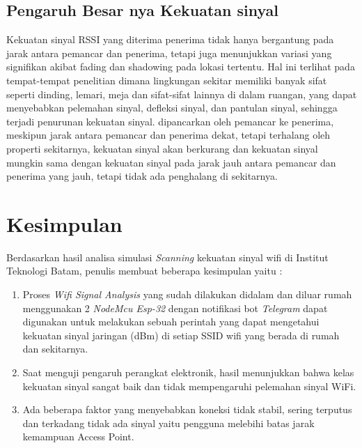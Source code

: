 \documentclass[conference]{IEEEtran}
\begin{document}
    

\subsection{Pengaruh Besar nya Kekuatan sinyal}



Kekuatan sinyal RSSI yang diterima penerima tidak hanya bergantung pada jarak antara pemancar dan penerima, tetapi juga menunjukkan variasi yang signifikan akibat fading dan shadowing pada lokasi tertentu. Hal ini terlihat pada tempat-tempat penelitian dimana lingkungan sekitar memiliki banyak sifat seperti dinding, lemari, meja dan sifat-sifat lainnya di dalam ruangan, yang dapat menyebabkan pelemahan sinyal, defleksi sinyal, dan pantulan sinyal, sehingga terjadi penurunan kekuatan sinyal. dipancarkan oleh pemancar ke penerima, meskipun jarak antara pemancar dan penerima dekat, tetapi terhalang oleh properti sekitarnya, kekuatan sinyal akan berkurang dan kekuatan sinyal mungkin sama dengan kekuatan sinyal pada jarak jauh antara pemancar dan penerima yang jauh, tetapi tidak ada penghalang di sekitarnya.

\section{Kesimpulan}

Berdasarkan hasil analisa simulasi \textit{Scanning} kekuatan sinyal wifi di Institut Teknologi Batam, penulis membuat beberapa kesimpulan yaitu :
\begin{enumerate}
    \item Proses \textit{Wifi Signal Analysis} yang sudah dilakukan didalam dan diluar rumah  menggunakan 2 \textit{NodeMcu Esp-32} dengan notifikasi bot \textit{Telegram} dapat digunakan untuk melakukan sebuah perintah yang dapat mengetahui kekuatan sinyal jaringan (dBm)
    di setiap SSID wifi yang berada di rumah dan sekitarnya.
    \item Saat menguji pengaruh perangkat elektronik, hasil menunjukkan bahwa kelas kekuatan sinyal sangat baik dan tidak mempengaruhi pelemahan sinyal WiFi.
   \item Ada beberapa faktor yang menyebabkan koneksi tidak stabil, sering terputus dan terkadang tidak ada sinyal yaitu pengguna melebihi batas jarak kemampuan Access Point.
\end{enumerate}

% 
% 
\end{document}
